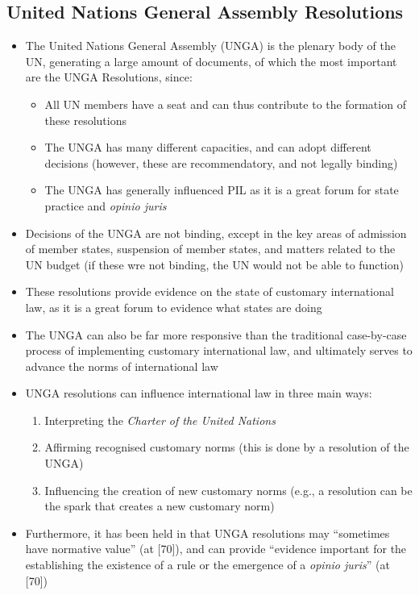 \subsection{United Nations General Assembly Resolutions}
\begin{itemize}
    \item The United Nations General Assembly (UNGA) is the plenary body of the UN, generating a large amount of documents, of which the most important are the UNGA Resolutions, since:
    \begin{itemize}
        \item All UN members have a seat and can thus contribute to the formation of these resolutions
        \item The UNGA has many different capacities, and can adopt different decisions (however, these are recommendatory, and not legally binding)
        \item The UNGA has generally influenced PIL as it is a great forum for state practice and \textit{opinio juris}
    \end{itemize}
    \item Decisions of the UNGA are not binding, except in the key areas of admission of member states, suspension of member states, and matters related to the UN budget (if these wre not binding, the UN would not be able to function)
    \item These resolutions provide evidence on the state of customary international law, as it is a great forum to evidence what states are doing
    \item The UNGA can also be far more responsive than the traditional case-by-case process of implementing customary international law, and ultimately serves to advance the norms of international law
    \item UNGA resolutions can influence international law in three main ways:
    \begin{enumerate}
        \item Interpreting the \textit{Charter of the United Nations}
        \item Affirming recognised customary norms (this is done by a resolution of the UNGA)
        \item Influencing the creation of new customary norms (e.g., a resolution can be the spark that creates a new customary norm)
    \end{enumerate}
    \item Furthermore, it has been held in  that UNGA resolutions may ``sometimes have normative value'' (at [70]), and can provide ``evidence important for the establishing the existence of a rule or the emergence of a \textit{opinio juris}'' (at [70])

\end{itemize}

